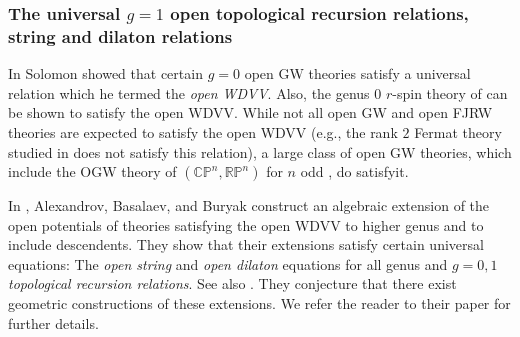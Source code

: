 \documentclass[11pt]{amsart}
\theoremstyle{definition}
\theoremstyle{remark}
\newcommand{\<}{\left<}
\renewcommand{\>}{\right>}
\numberwithin{equation}{section}
\begin{document}
\subsubsection{The universal $g=1$ open topological recursion relations, string and dilaton relations}
In \cite{sol_owdvv} Solomon showed that certain $g=0$ open GW theories satisfy a universal relation which he termed the %
\emph{open WDVV}. Also, the %
genus $0$ $r$-spin theory of \cite{BCT1,BCT2,BCT3} can be shown to satisfy the open WDVV. While not all open GW and open FJRW theories are expected to satisfy the open %
WDVV (e.g., the rank $2$ Fermat %
theory studied in \cite{GKT2} does not satisfy this relation), a large class of open GW theories, which include  the OGW theory of $(\mathbb{CP}^n,\mathbb{RP}^n)$ for $n$ odd \cite{solomon2023relative},  %
do satisfyit.

In \cite{alexandrov2023construction}, Alexandrov, Basalaev, and %
Buryak construct an algebraic extension of the open potentials of theories satisfying the open WDVV to higher genus and to include descendents. They show that their extensions satisfy certain universal %
equations: The \emph{open string} %
and \emph{open dilaton} equations for %
all genus and %
$g=0,1$ \emph{topological recursion relations}. See also \cite{gomez2021open}.
They conjecture that there exist geometric constructions of these extensions. We refer the reader to their paper for further details.
\end{document}
